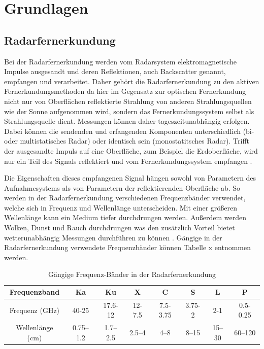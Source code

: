 \newpage
\restoregeometry
\section{Grundlagen}
\subsection{Radarfernerkundung}
Bei der Radarfernerkundung werden vom Radarsystem elektromagnetische Impulse ausgesandt und deren Reflektionen, auch Backscatter genannt, empfangen und 
verarbeitet. Daher gehört die Radarfernerkundung zu den aktiven Fernerkundungsmethoden da hier im Gegensatz zur optischen Fernerkundung nicht nur 
von Oberflächen reflektierte Strahlung von anderen Strahlungsquellen wie der Sonne aufgenommen wird, sondern das Fernerkundungssystem 
selbst als Strahlungsquelle dient. Messungen können daher tageszeitunabhängig erfolgen. Dabei können die sendenden und erfangenden Komponenten unterschiedlich (bi- oder multistatisches Radar) oder 
identisch sein (monostatitsches Radar). Trifft der ausgesandte Impuls auf eine Oberfläche, zum Beispiel die Erdoberfläche, wird nur ein Teil des Signals 
reflektiert und vom Fernerkundungssystem empfangen \cite{tutorial_on_sar}. 

Die Eigenschaften dieses empfangenen Signal hängen sowohl von Parametern des Aufnahmesystems als von Parametern der reflektierenden Oberfläche ab.
So werden in der Radarfernerkundung verschiedenen Frequenzbänder verwendet, welche sich in Frequenz und Wellenlänge unterscheiden. 
Mit einer größeren Wellenlänge kann ein Medium tiefer durchdrungen werden. Außerdem werden Wolken, Dunst und Rauch durchdrungen was den zusätzlich Vorteil bietet
wetterunabhängig Messungen durchführen zu können \cite{einfuehrung_in_fernerkundung}. Gängige in der Radarfernerkundung verwendete Frequenzbänder können Tabelle x entnommen werden. 

\begin{table}[htb]
    \caption{Gängige Frequenz-Bänder in der Radarfernerkundung}
\begin{center}
    \begin{tabular}{|c|c|c|c|c|c|c|c|} 
        Frequenzband & Ka & Ku & X & C & S & L & P\\ 
        \hline
        Frequenz (GHz) & 40-25 & 17.6-12 & 12-7.5 & 7.5-3.75 & 3.75-2 & 2-1 & 0.5-0.25\\ 
        Wellenlänge (cm) & 0.75–1.2 & 1.7–2.5 & 2.5–4 & 4–8 & 8–15 & 15–30 & 60–120\\ 
    \end{tabular}
    \label{table:1}
\end{center}
\end{table}

